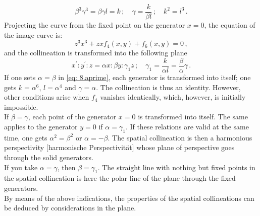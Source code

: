 \documentclass[leqno]{article}
\begin{document}
\begin{equation}\label{eq: 8.b}
\beta^3 \gamma^3 = \beta \gamma l = k \, ; \quad \gamma = \frac{k}{\beta l} \, ; \quad k^2 = l^3 \, . \tag{b} 
\end{equation}
Projecting the curve from the fixed point on the generator $x=0$, the equation of the image curve is: 
\[
z^3 x^3 + zx f_4(x, y) + f_6(x, y) = 0 \, , 
\] 
and the collineation is transformed into the following plane
\begin{equation}\label{eq: 8.a1prime}
x^\prime : y^\prime : z = \alpha x : \beta y : \gamma_1 z \, ; \quad \gamma_1 = \frac{k}{\alpha l} = \frac{\beta}{\alpha} \gamma \, . \tag{$a_1^\prime$}
\end{equation}
If one sets $\alpha=\beta$ in \eqref{eq: 8.aprime}, each generator is transformed into itself; one gets $k=\alpha^6$, $l=\alpha^4$ and $\gamma=\alpha$. The collineation is thus an identity. However, other conditions arise when $f_4$ vanishes identically, which, however, is initially impossible. \\
If $\beta = \gamma$, each point of the generator $x=0$ is transformed into itself. The same applies to the generator $y=0$ if $\alpha = \gamma_1$. If these relations are valid at the same time, one gets $\alpha^2 = \beta^2$ or $\alpha=-\beta$. The spatial collineation is then a harmonious perspectivity [harmonische Perspectivit\"at] whose plane of perspective goes through the solid generators. \\
If you take $\alpha = \gamma$, then $\beta = \gamma_1$. The straight line with nothing but fixed points in the spatial collineation is here the polar line of the plane through the fixed generators. \\
By means of the above indications, the properties of the spatial collineations can be deduced by considerations in the plane.
\end{document}
